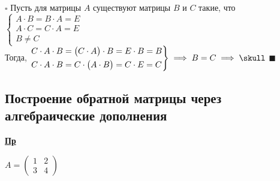 \documentclass[12pt, a4paper]{report}
\newcommand{\ex}{\begin{flushleft}\textbf{\underline{Пр}}\end{flushleft}}
\begin{document}
\begin{enumerate}[1)]
			\(\square\) Пусть для матрицы \(A\) существуют матрицы \(B\) и \(C\) такие, что \(\begin{cases}A\cdot B=B\cdot A = E\\A\cdot C=C\cdot A= E\\ B\neq C\end{cases}\)\\
			Тогда, \(\begin{rcases}C\cdot A\cdot B=\big(C\cdot A\big)\cdot B=E\cdot B=B\\C\cdot A\cdot B=C\cdot\big(A\cdot B\big)=C\cdot E= C\end{rcases}\implies B=C\implies\skull\) \(\blacksquare\)
	\end{enumerate}
	\subsection{Построение обратной матрицы через алгебраические дополнения}
	\ex
	
	\(A=\begin{pmatrix}1&2\\3&4\end{pmatrix}\)
	
\end{document}
